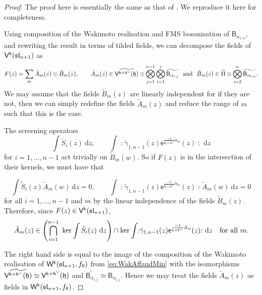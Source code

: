 \documentclass[10pt,a4paper]{amsart}
\numberwithin{equation}{section}
\renewcommand{\cong}{\simeq} %
\newcommand{\dd}{\mathrm{d}}   %
\newcommand{\ee}{\mathsf{e}}   %
\newcommand{\kk}{\mathsf{k}}   %
\DeclarePairedDelimiter{\brac}{\lparen}{\rparen}   %
\newcommand{\no}[1]{\mathopen{:} #1 \mathclose{:}} %
\newcommand{\alg}[1]{\mathfrak{#1}}  %
\newcommand{\VOA}[1]{\mathsf{#1}}    %
\newcommand{\SLA}[2]{\alg{#1}_{#2}}                      %
\newcommand{\slnpone}{\SLA{sl}{n+1}}
\newcommand{\cartan}{\mathfrak{h}}
\newcommand{\cox}{\mathsf{h}}                                        %
\newcommand{\dcox}{\coroot{\cox}}                                    %
\newcommand{\sroot}[1]{\alpha_{#1}}                                  %
\newcommand{\tsroot}[1]{\tilde{\alpha}_{#1}}                         %
\newcommand{\coroot}[1]{#1^{\vee}}                                   %
\newcommand{\fmin}{f_\theta}                                        %
\newcommand{\Wsymb}{\VOA{W}}
\newcommand{\uaffvoa}[2]{\VOA{V}^{#1}\brac{#2}}                   %
\newcommand{\bgvoa}{\VOA{B}}                                      %
\newcommand{\uQHR}[3]{\Wsymb^{#1}\brac{#2,#3}}                    %
\theoremstyle{plain}
\begin{document}
\begin{proof}
The proof here is essentially the same as that of \cite[Thm.~3.3]{Feh21c}. We reproduce it here for completeness. 

Using composition of the Wakimoto realisation and FMS bosonisation of $\bgvoa_{\sroot{1,n}}$, and rewriting the result in terms of tilded fields, we can decompose the fields of $\uaffvoa{\kk}{\slnpone}$ as 
%
\begin{equation}
    F(z) = \sum_m \tilde{A}_m(z) \otimes \tilde{B}_m(z), \qquad 
    \tilde{A}_m(z) \in \widetilde{\uaffvoa{\kk+\dcox}{\cartan}} \otimes \bigotimes_{j=1}^{n-1}\bigotimes_{i=1}^{j} \widetilde{\bgvoa_{\sroot{i,j}}} \ \text{  and  } \
    \tilde{B}_m(z) \in  \widetilde{\Pi} \otimes  \bigotimes_{i=2}^{n} \widetilde{\bgvoa_{\sroot{i,n}}}.
\end{equation}
%
We may assume that the fields $\tilde{B}_m(z)$ are linearly independent for if they are not, then we can simply redefine the fields $\tilde{A}_m(z)$ and reduce the range of $m$ such that this is the case. 

The screening operators
%
\begin{equation}
    \int \tilde{S}_i(z) \ \dd z, \qquad \int \no{\tilde{\gamma}_{1,n-1}(z) \ee^{\frac{-1}{\kk+\dcox} \tsroot{n}}(z)} \ \dd z
\end{equation}
%
for $i =1, \dots, n-1$ act trivially on $\tilde{B}_m(w)$. So if $F(z)$ is in the intersection of their kernels, we must have that 

\begin{equation} \label{eq:findingreg}
   \int \tilde{S}_i(z) \tilde{A}_m(w)\ \dd z=0, \qquad \int \no{\tilde{\gamma}_{1,n-1}(z) \ee^{\frac{-1}{\kk+\dcox} \tsroot{n}}(z)} \tilde{A}_m(w) \ \dd z=0
\end{equation}
%
for all $i = 1,\dots, n-1$ and $m$ by the linear independence of the fields $\tilde{B}_m(z)$. Therefore, since $F(z) \in \uaffvoa{\kk}{\slnpone}$,
%
\begin{equation}
     \tilde{A}_m(z) \in \left( \bigcap_{i=1}^{n-1} \textup{ ker} \int \tilde{S}_i(z) \ \dd z \right) \cap \textup{ker} \int \no{\tilde{\gamma}_{1,n-1}(z) \ee^{\frac{-1}{\kk+\dcox} \tsroot{n}}(z)} \ \dd z  \quad \text{for all } m.
\end{equation}

The right hand side is equal to the image of the composition of the Wakimoto realisation of $\uQHR{\kk}{\slnpone}{\fmin}$ from \eqref{eq:WakAffandMin} with the isomorphisms $ \widetilde{\uaffvoa{\kk+\dcox}{\cartan}} \cong  \uaffvoa{\kk+\dcox}{\cartan}$ and $\widetilde{\bgvoa_{\sroot{i,j}}} \cong \bgvoa_{\sroot{i,j}}$. Hence we may treat the fields $\tilde{A}_m(z)$ as fields in $\uQHR{\kk}{\slnpone}{\fmin}$. 


\end{proof}
\end{document}
